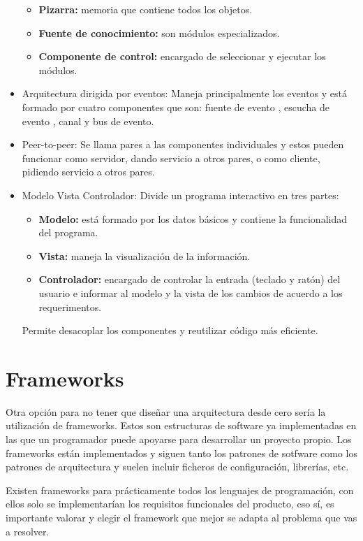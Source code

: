 \documentclass[12pt]{report} %
\begin{document}
\begin{itemize}
 	\begin{itemize}
 		\item \textbf{Pizarra:} memoria que contiene todos los objetos. 
 		\item \textbf{Fuente de conocimiento:} son módulos especializados. 
 		\item \textbf{Componente de control:} encargado de seleccionar y ejecutar los módulos.
 	\end{itemize}
 	\item Arquitectura dirigida por eventos: Maneja principalmente los eventos y está formado por cuatro componentes que son: fuente de evento , escucha de evento , canal y bus de evento.
 	\item Peer-to-peer: Se llama pares a las componentes individuales y estos pueden funcionar como servidor, dando servicio a otros pares, o como cliente, pidiendo servicio a otros pares.
 	\item Modelo Vista Controlador: Divide un programa interactivo en tres partes:
 		\begin{itemize}
 			\item \textbf{Modelo:} está formado por los datos básicos y contiene la funcionalidad del programa. 
 			\item \textbf{Vista:} maneja la visualización de la información. 
 			\item \textbf{Controlador:} encargado de controlar la entrada (teclado y ratón) del usuario e informar al modelo y la vista de los cambios de acuerdo a los requerimentos.
 		\end{itemize}
 	Permite desacoplar los componentes y reutilizar código más eficiente. 
 \end{itemize}

\section{Frameworks}
 Otra opción para no tener que diseñar una arquitectura desde cero sería la utilización de frameworks. Estos son estructuras de software ya implementadas en las que un programador puede apoyarse para desarrollar un proyecto propio. Los frameworks están implementados y siguen tanto los patrones de sotfware como los patrones de arquitectura y suelen incluir ficheros de configuración, librerías, etc.
 
 Existen frameworks para prácticamente todos los lenguajes de programación, con ellos solo se implementarían los requisitos funcionales del producto, eso sí, es importante valorar y elegir el framework que mejor se adapta al problema que vas a resolver.
 
\end{document}

